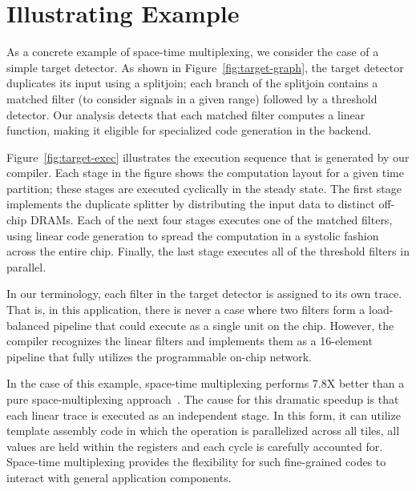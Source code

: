 
\section{Illustrating Example}
\label{sec:example}

As a concrete example of space-time multiplexing, we consider the case
of a simple target detector.  As shown in
Figure~\ref{fig:target-graph}, the target detector duplicates its
input using a splitjoin; each branch of the splitjoin contains a
matched filter (to consider signals in a given range) followed by a
threshold detector.  Our analysis detects that each matched filter
computes a linear function, making it eligible for specialized code
generation in the backend.

Figure~\ref{fig:target-exec} illustrates the execution sequence that
is generated by our compiler.  Each stage in the figure shows the
computation layout for a given time partition; these stages are
executed cyclically in the steady state.  The first stage implements
the duplicate splitter by distributing the input data to distinct
off-chip DRAMs.  Each of the next four stages executes one of the
matched filters, using linear code generation to spread the
computation in a systolic fashion across the entire chip.  Finally,
the last stage executes all of the threshold filters in parallel.

In our terminology, each filter in the target detector is assigned to
its own trace.  That is, in this application, there is never a case
where two filters form a load-balanced pipeline that could execute as
a single unit on the chip.  However, the compiler recognizes the
linear filters and implements them as a 16-element pipeline that fully
utilizes the programmable on-chip network.

In the case of this example, space-time multiplexing performs 7.8X
better than a pure space-multiplexing approach~\cite{streamit-asplos}.
The cause for this dramatic speedup is that each linear trace is
executed as an independent stage.  In this form, it can utilize
template assembly code in which the operation is parallelized across
all tiles, all values are held within the registers and each cycle is
carefully accounted for.  Space-time multiplexing provides the
flexibility for such fine-grained codes to interact with general
application components.

